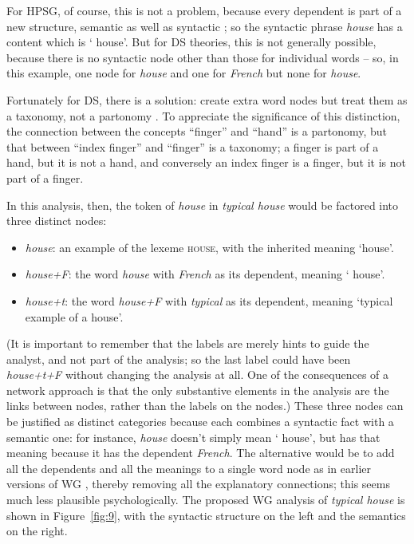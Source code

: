 \documentclass[output=paper
 	        ,biblatex
                ,babelshorthands
                ,newtxmath
                ,draftmode
                ,colorlinks, citecolor=brown
]{langscibook}
\begin{document}
For HPSG, of course, this is not a problem, because every dependent is part of a new structure, semantic as well as syntactic \citep{MuellerEvaluating}; so the syntactic phrase \emph{ house} has a content which is ‘ house’. But for DS theories, this is not generally possible, because there is no syntactic node other than those for individual words – so, in this example, one node for \emph{house} and one for \emph{French} but none for \emph{ house}.

Fortunately for DS, there is a solution: create extra word nodes but treat them as a taxonomy, not a partonomy \citep{Hudson2018a}. To appreciate the significance of this distinction, the connection between the concepts ``finger'' and ``hand'' is a partonomy, but that between ``index finger'' and ``finger'' is a taxonomy; a finger is part of a hand, but it is not a hand, and conversely an index finger is a finger, but it is not part of a finger.

In this analysis, then, the token of \emph{house} in \emph{typical  house} would be factored into three distinct nodes:

\begin{itemize}
	\item \emph{house}: \label{it:house} an example of the lexeme \textsc{house}, with the inherited meaning ‘house’.
	
	\item \emph{house+F}: \label{it:house+f} the word \emph{house} with \emph{French} as its dependent, meaning ‘ house’.
	
	\item \emph{house+t}: \label{it:house+t} the word \emph{house+F} with \emph{typical} as its dependent, meaning ‘typical example of a  house’.
\end{itemize}

(It is important to remember that the labels are merely hints to guide the analyst, and not part of the analysis; so the last label could have been \emph{house+t+F} without changing the analysis at all. One of the consequences of a network approach is that the only substantive elements in the analysis are the links between nodes, rather than the labels on the nodes.) These three nodes can be justified as distinct categories because each combines a syntactic fact with a semantic one: for instance, \emph{house} doesn’t simply mean ‘ house’, but has that meaning because it has the dependent \emph{French}. The alternative would be to add all the dependents and all the meanings to a single word node as in earlier versions of WG \citep[146–151]{Hudson90a-u}, thereby removing all the explanatory connections; this seems much less plausible psychologically. The proposed WG analysis of \emph{typical  house} is shown in Figure~\ref{fig:9}, with the syntactic structure on the left and the semantics on the right.
\end{document}
